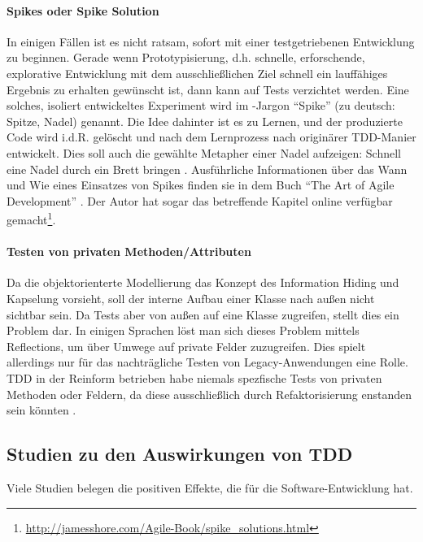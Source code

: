   \paragraph{Spikes oder Spike Solution} In einigen Fällen ist es nicht ratsam, sofort mit einer testgetriebenen Entwicklung zu beginnen. Gerade wenn Prototypisierung, d.h. schnelle, erforschende, explorative Entwicklung mit dem ausschließlichen Ziel schnell ein lauffähiges Ergebnis zu erhalten gewünscht ist, dann kann auf Tests verzichtet werden. Eine solches, isoliert entwickeltes Experiment wird im -Jargon "`Spike"' (zu deutsch: Spitze, Nadel) genannt. Die Idee dahinter ist es zu Lernen, und der produzierte Code wird i.d.R. gelöscht und nach dem Lernprozess nach originärer TDD-Manier entwickelt. Dies soll auch die gewählte Metapher einer Nadel aufzeigen: Schnell eine Nadel durch ein Brett bringen \citep{shore_art_2007}. Ausführliche Informationen über das Wann und Wie eines Einsatzes von Spikes finden sie in dem Buch "`The Art of Agile Development"' \citep{shore_art_2007}. Der Autor hat sogar das betreffende Kapitel online verfügbar gemacht\footnote{\url{http://jamesshore.com/Agile-Book/spike_solutions.html}}.

  \paragraph{Testen von privaten Methoden/Attributen} Da die objektorienterte Modellierung das Konzept des Information Hiding und Kapselung vorsieht, soll der interne Aufbau einer Klasse nach außen nicht sichtbar sein. Da Tests aber von außen auf eine Klasse zugreifen, stellt dies ein Problem dar. In einigen Sprachen löst man sich dieses Problem mittels Reflections, um über Umwege auf private Felder zuzugreifen. Dies spielt allerdings nur für das nachträgliche Testen von Legacy-Anwendungen eine Rolle. TDD in der Reinform betrieben habe niemals spezfische Tests von privaten Methoden oder Feldern, da diese ausschließlich durch Refaktorisierung enstanden sein könnten \citep{caroli_agile_2008}.
 
  
  
\subsection{Studien zu den Auswirkungen von TDD}

Viele Studien belegen die positiven Effekte, die  für die Software-Entwicklung hat.

